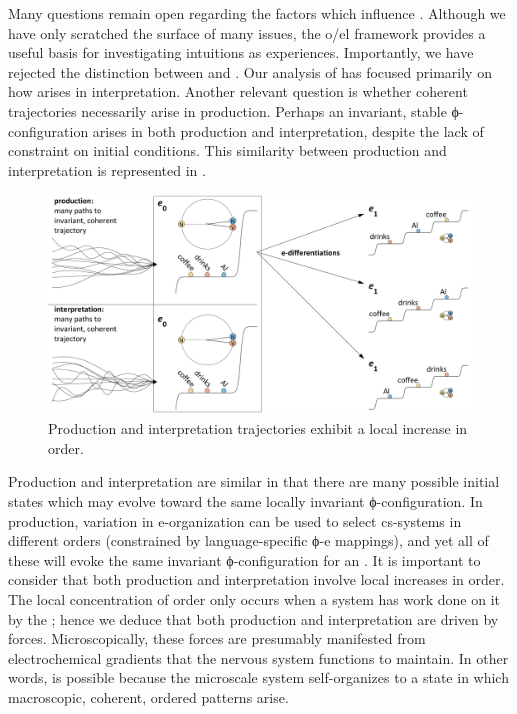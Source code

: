   Many questions remain open regarding the factors which influence . Although we have only scratched the surface of many issues, the o/el framework provides a useful basis for investigating intuitions as experiences. Importantly, we have rejected the distinction between  and . Our analysis of  has focused primarily on how  arises in interpretation. Another relevant question is whether coherent trajectories necessarily arise in production. Perhaps an invariant, stable ϕ-con\-fi\-gu\-ra\-tion arises in both production and interpretation, despite the lack of constraint on initial conditions. This similarity between production and interpretation is represented in {}.

  
\begin{figure}
\includegraphics[width=\textwidth]{figures/Tilsen-img135.png}
\caption{Production and interpretation trajectories exhibit a local increase in order.}
\label{fig:6:16}
\end{figure}
 

  Production and interpretation are similar in that there are many possible initial states which may evolve toward the same locally invariant ϕ-con\-fi\-gu\-ra\-tion. In production, variation in e-or\-ga\-ni\-za\-tion can be used to select cs-sys\-tems in different orders (constrained by language-specific ϕ-e mappings), and yet all of these will evoke the same invariant ϕ-con\-fi\-gu\-ra\-tion for an . It is important to consider that both production and interpretation involve local increases in order. The local concentration of order only occurs when a system has work done on it by the ; hence we deduce that both production and interpretation are driven by  forces. Microscopically, these forces are presumably manifested from electrochemical gradients that the nervous system functions to maintain. In other words,  is possible because the microscale system self-organizes to a state in which macroscopic, coherent, ordered patterns arise.

